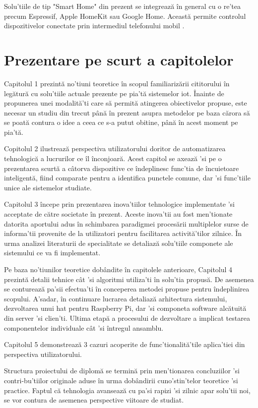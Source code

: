 Solu'tiile de tip "Smart Home" din prezent se integrează în general cu o re'tea precum Espressif, Apple HomeKit sau Google Home. Această permite controlul dispozitivelor conectate prin intermediul telefonului mobil \cite{RISTESKASTOJKOSKA20171454}.


\section {Prezentare pe scurt a capitolelor}

Capitolul 1 prezintă no'tiuni teoretice în scopul familiarizării cititorului în legătură cu solu'tiile actuale prezente pe pia'tă sistemelor \acrshort{iot}. Înainte de propunerea unei modalită'ti care să permită atingerea obiectivelor propuse, este necesar un studiu din trecut până în prezent asupra metodelor pe baza cărora să se poată contura o idee a ceea ce s-a putut obitine, până în acest moment pe pia'tă.

Copitolul 2 ilustrează perspectiva utilizatorului doritor de automatizarea tehnologică a lucrurilor ce îl înconjoară. Acest capitol se axează 'si pe o prezentarea scurtă a câtorva dispozitive ce îndeplinesc func'tia de încuietoare inteligentă, fiind comparate pentru a identifica punctele comune, dar 'si func'tiile unice ale sistemelor studiate.

Capitolul 3 începe prin prezentarea inova'tiilor tehnologice implementate 'si acceptate de către societate în prezent. Aceste inova'tii au fost men'tionate datorita aportului adus în schimbarea paradigmei procesării multiplelor surse de informa'tii provenite de la utilizatori pentru facilitarea activită'tilor zilnice. În urma analizei literaturii de specialitate se detaliază solu'tiile componete ale sistemului ce va fi implementat.

Pe baza no'tiunilor teoretice dobândite în capitolele anterioare, Capitolul 4 prezintă detalii tehnice cât 'si algoritmi utiliza'ti în solu'tia propusă. De asemenea se conturează pa'sii efectua'ti în conceperea metodei propuse pentru îndeplinirea scopului. A'sadar, în continuare lucrarea detaliază arhitectura sistemului, dezvoltarea unui \acrshort{hat} pentru Raspberry Pi, dar 'si componeta software alcătuită din server 'si clien'ti. Ultima etapă a procesului de dezvoltare a implicat testarea componentelor individuale cât 'si întregul ansamblu.

Capitolul 5 demonstrează 3 cazuri acoperite de func'tionalită'tile aplica'tiei din perspectiva utilizatorului.

Structura proiectului de diplomă se termină prin men'tionarea concluziilor 'si contri-bu'tiilor originale aduse în urma dobândirii cuno'stin'telor teoretice 'si practice. Faptul că tehnologia avansează cu pa'si rapizi 'si zilnic apar solu'tii noi, se vor contura de asemenea perspective viitoare de studiat.
